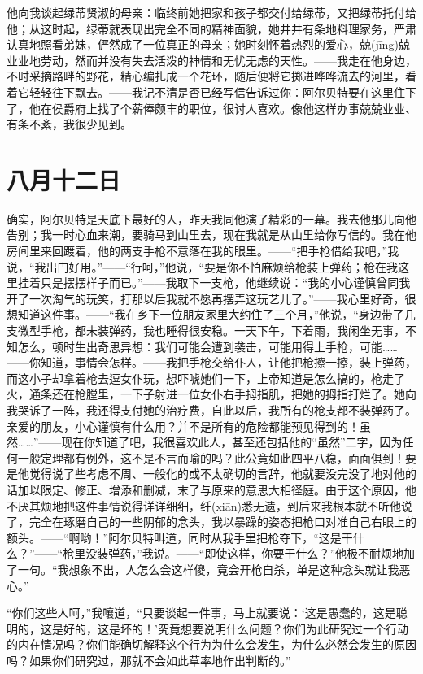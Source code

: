 \documentclass[12pt,oneside]{book}
\begin{document}
他向我谈起绿蒂贤淑的母亲：临终前她把家和孩子都交付给绿蒂，又把绿蒂托付给他；从这时起，绿蒂就表现出完全不同的精神面貌，她井井有条地料理家务，严肃认真地照看弟妹，俨然成了一位真正的母亲；她时刻怀着热烈的爱心，兢(jīng)兢业业地劳动，然而并没有失去活泼的神情和无忧无虑的天性。——我走在他身边，不时采摘路畔的野花，精心编扎成一个花环，随后便将它掷进哗哗流去的河里，看着它轻轻往下飘去。——我记不清是否已经写信告诉过你：阿尔贝特要在这里住下了，他在侯爵府上找了个薪俸颇丰的职位，很讨人喜欢。像他这样办事兢兢业业、有条不紊，我很少见到。
　
　
\chapter{八月十二日}
\label{sec-2-32}
确实，阿尔贝特是天底下最好的人，昨天我同他演了精彩的一幕。我去他那儿向他告别；我一时心血来潮，要骑马到山里去，现在我就是从山里给你写信的。我在他房间里来回踱着，他的两支手枪不意落在我的眼里。——“把手枪借给我吧，”我说，“我出门好用。”——“行呵，”他说，“要是你不怕麻烦给枪装上弹药；枪在我这里挂着只是摆摆样子而已。”——我取下一支枪，他继续说：“我的小心谨慎曾同我开了一次淘气的玩笑，打那以后我就不愿再摆弄这玩艺儿了。”——我心里好奇，很想知道这件事。——“我在乡下一位朋友家里大约住了三个月，”他说，“身边带了几支微型手枪，都未装弹药，我也睡得很安稳。一天下午，下着雨，我闲坐无事，不知怎么，顿时生出奇思异想：我们可能会遭到袭击，可能用得上手枪，可能……——你知道，事情会怎样。——我把手枪交给仆人，让他把枪擦一擦，装上弹药，而这小子却拿着枪去逗女仆玩，想吓唬她们一下，上帝知道是怎么搞的，枪走了火，通条还在枪膛里，一下子射进一位女仆右手拇指肌，把她的拇指打烂了。她向我哭诉了一阵，我还得支付她的治疗费，自此以后，我所有的枪支都不装弹药了。亲爱的朋友，小心谨慎有什么用？并不是所有的危险都能预见得到的！虽然……”——现在你知道了吧，我很喜欢此人，甚至还包括他的“虽然”二字，因为任何一般定理都有例外，这不是不言而喻的吗？此公竟如此四平八稳，面面俱到！要是他觉得说了些考虑不周、一般化的或不太确切的言辞，他就要没完没了地对他的话加以限定、修正、增添和删减，末了与原来的意思大相径庭。由于这个原因，他不厌其烦地把这件事情说得详详细细，纤(xiān)悉无遗，到后来我根本就不听他说了，完全在琢磨自己的一些阴郁的念头，我以暴躁的姿态把枪口对准自己右眼上的额头。——“啊哟！”阿尔贝特叫道，同时从我手里把枪夺下，“这是干什么？”——“枪里没装弹药，”我说。——“即使这样，你要干什么？”他极不耐烦地加了一句。“我想象不出，人怎么会这样傻，竟会开枪自杀，单是这种念头就让我恶心。”

“你们这些人呵，”我嚷道，“只要谈起一件事，马上就要说：‘这是愚蠢的，这是聪明的，这是好的，这是坏的！’究竟想要说明什么问题？你们为此研究过一个行动的内在情况吗？你们能确切解释这个行为为什么会发生，为什么必然会发生的原因吗？如果你们研究过，那就不会如此草率地作出判断的。”
\end{document}
